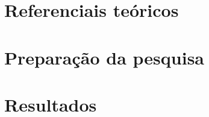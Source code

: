 \documentclass[
	12pt,				%
	openright,			%
	twoside,			%
	a4paper,			%
	english,			%
	french,				%
	spanish,			%
	brazil				%
	]{senai-cimatec-abntex2}
\begin{document}
\tableofcontents*
\cleardoublepage

\textual
\part{Referenciais teóricos}
\part{Preparação da pesquisa}
\part{Resultados}

\postextual




\begin{apendicesenv}
	\partapendices	%
	
	
\end{apendicesenv}

\begin{anexosenv}
	\partanexos	%
	
	
	
\end{anexosenv}

\printindex
\end{document}
